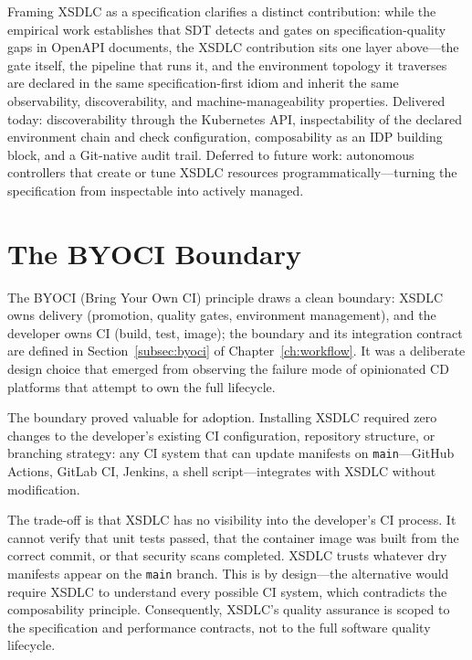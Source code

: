 Framing XSDLC as a specification clarifies a distinct contribution: while the empirical work establishes that SDT detects and gates on specification-quality gaps in OpenAPI documents, the XSDLC contribution sits one layer above---the gate itself, the pipeline that runs it, and the environment topology it traverses are declared in the same specification-first idiom and inherit the same observability, discoverability, and machine-manageability properties. Delivered today: discoverability through the Kubernetes API, inspectability of the declared environment chain and check configuration, composability as an IDP building block, and a Git-native audit trail. Deferred to future work: autonomous controllers that create or tune XSDLC resources programmatically---turning the specification from inspectable into actively managed.

\section{The BYOCI Boundary}
\label{sec:byoci-discussion}

The BYOCI (Bring Your Own CI) principle draws a clean boundary: XSDLC owns delivery (promotion, quality gates, environment management), and the developer owns CI (build, test, image); the boundary and its integration contract are defined in Section~\ref{subsec:byoci} of Chapter~\ref{ch:workflow}. It was a deliberate design choice that emerged from observing the failure mode of opinionated CD platforms that attempt to own the full lifecycle.

The boundary proved valuable for adoption. Installing XSDLC required zero changes to the developer's existing CI configuration, repository structure, or branching strategy: any CI system that can update manifests on \texttt{main}---GitHub Actions, GitLab CI, Jenkins, a shell script---integrates with XSDLC without modification.

The trade-off is that XSDLC has no visibility into the developer's CI process. It cannot verify that unit tests passed, that the container image was built from the correct commit, or that security scans completed. XSDLC trusts whatever dry manifests appear on the \texttt{main} branch. This is by design---the alternative would require XSDLC to understand every possible CI system, which contradicts the composability principle. Consequently, XSDLC's quality assurance is scoped to the specification and performance contracts, not to the full software quality lifecycle.

